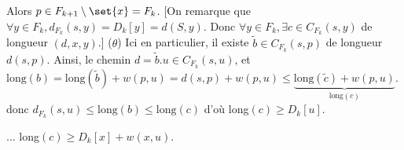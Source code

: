 \documentclass{scrartcl}
\begin{document}
\begin{demo}
\begin{itemize}
					 Alors $p \in F_{k+1} \setminus \set{x} = F_k$.
					[On remarque que $\forall y \in F_k, d_{F_k}(s,y) = D_k[y] = d(S,y)$.
					Donc $\forall y \in F_k, \exists c \in C_{F_k}(s,y)$ de longueur $(d,x,y)$.] ($\theta$)
					Ici en particulier, il existe $\widetilde{b} \in C_{F_k}(s,p)$ de longueur $d(s,p)$.
					Ainsi, le chemin $d = \widetilde{b}.u \in C_{F_k}(s,u)$, 
					et $\text{long}(b) = \text{long}(\widetilde{b}) + w(p,u) = d(s,p) + w(p,u) \leq \underbrace{\text{long}(\widetilde{c}) + w(p,u)}_{\text{long}(c)}$.
					donc $d_{F_k}(s,u) \leq \text{long}(b) \leq \text{long}(c)$ d'où long$(c) \geq D_k[u]$.

					... long$(c) \geq D_k[x] + w(x,u)$. 
				\end{itemize}	
			\end{demo}
\end{document}
